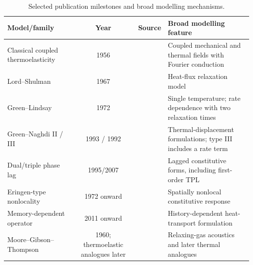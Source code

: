 \begin{table}[htbp]
\centering
\small
\caption{Selected publication milestones and broad modelling mechanisms.}
\label{tab:T1-historical}
\begin{tabularx}{\textwidth}{@{}p{3.0cm}c p{2.4cm}X@{}}
\toprule
\textbf{Model/family} & \textbf{Year} & \textbf{Source} & \textbf{Broad modelling feature} \\
\midrule
Classical coupled thermoelasticity & 1956 & \cite{Biot1956} & Coupled mechanical and thermal fields with Fourier conduction \\
Lord--Shulman & 1967 & \cite{Lord1967} & Heat-flux relaxation model \\
Green--Lindsay & 1972 & \cite{Green1972} & Single temperature; rate dependence with two relaxation times \\
Green--Naghdi II / III & 1993 / 1992 & \cite{Green1993,GreenGN1992} & Thermal-displacement formulations; type III includes a rate term \\
Dual/triple phase lag & 1995/2007 & \cite{Tzou1995,RoyChoudhuri2007} & Lagged constitutive forms, including first-order TPL \\
Eringen-type nonlocality & 1972 onward & \cite{Eringen1972,Eringen1974,Eringen1983} & Spatially nonlocal constitutive response \\
Memory-dependent operator & 2011 onward & \cite{Wang2011} & History-dependent heat-transport formulation \\
Moore--Gibson--Thompson & 1960; thermoelastic analogues later & \cite{MooreGibson1960,Quintanilla2019} & Relaxing-gas acoustics and later thermal analogues \\
\bottomrule
\end{tabularx}
\end{table}
